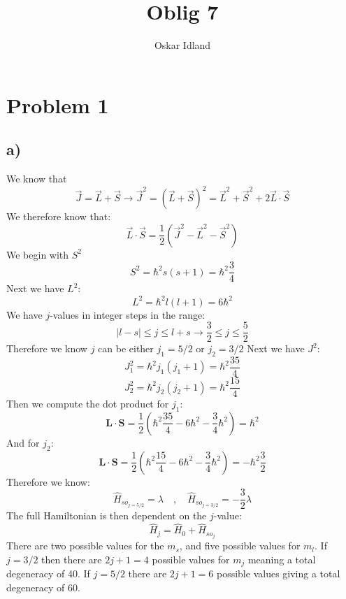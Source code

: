\documentclass{article}
\author{Oskar Idland}
\title{Oblig 7}
\date{}
\begin{document}
\maketitle
\newpage

\section*{Problem 1}
\subsection*{a)}
We know that
\[
\vec{J} = \vec{L} + \vec{S} → \vec{J}^2 = (\vec{L} + \vec{S})^2 = \vec{L}^2 + \vec{S}^2 + 2\vec{L} ⋅ \vec{S}
\]
We therefore know that:
\[
\vec{L} ⋅ \vec{S} = \frac{1}{2}(\vec{J}^2 - \vec{L}^2 - \vec{S}^2)
\]
We begin with $S^2$
\[
S^2 = ℏ^2 s(s+1)  = ℏ^2 \frac{3}{4}
\]
Next we have $L^2$:
\[
L^2 = ℏ^2 l(l+1) = 6ℏ^2
\]
We have $j$-values in integer steps in the range:
\[
\left|l-s\right| \le j \le l+s → \frac{3}{2} \le  j \le \frac{5}{2}   
\]
Therefore we know $j$ can be either $j_1 = 5 / 2$ or $j_2 = 3 / 2$
Next we have $J^2$:
    \[
J_1^2 = ℏ^2 j_1(j_1+1) = ℏ^2 \frac{35}{4}
\]
\[
J_2^2 = ℏ^2 j_2(j_2+1) = ℏ^2 \frac{15}{4}
\]
Then we compute the dot product for $j_1$:
\[
\mathbf{L} ⋅ \mathbf{S} = \frac{1}{2} \left(ℏ^2 \frac{35}{4} - 6ℏ^2 -  \frac{3}{4}ℏ^2\right) = ℏ^2
\]
And for $j_2$:
\[
    \mathbf{L} ⋅ \mathbf{S} = \frac{1}{2} \left(ℏ^2 \frac{15}{4} - 6ℏ^2 -  \frac{3}{4}ℏ^2\right) = - ℏ^2 \frac{3}{2}
\]
Therefore we know:
\[
\hat{H}_{so_{j = 5 / 2}} = λ \quad , \quad \hat{H}_{so_{j = 3 / 2}} = - \frac{3}{2} λ
\]
The full Hamiltonian is then dependent on the $j$-value:
\[
\hat{H}_j = \hat{H}_0 + \hat{H}_{so_j} 
\]
There are two possible values for the $m_s$, and five possible values for $m_l$. If $j = 3 / 2$ then there are  $2j + 1 = 4$ possible values for $m_j$ meaning a total degeneracy of 40. If $j = 5 / 2$ there are $2j + 1 = 6$ possible values giving a total degeneracy of 60.
\end{document}
